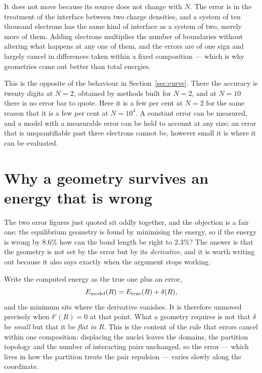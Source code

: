 \documentclass[11pt]{article}
\begin{document}
It does not move because its source does not change with $N$. The error is in the treatment of the
interface between two charge densities, and a system of ten thousand electrons has the same kind of
interface as a system of two, merely more of them. Adding electrons multiplies the number of
boundaries without altering what happens at any one of them, and the errors are of one sign and
largely cancel in differences taken within a fixed composition --- which is why geometries come out
better than total energies.

This is the opposite of the behaviour in Section~\ref{sec:curve}. There the accuracy is twenty
digits at $N=2$, obtained by methods built for $N=2$, and at $N=10$ there is no error bar to
quote. Here it is a few per cent at $N=2$ for the same reason that it is a few per cent at
$N=10^4$. A constant error can be measured, and a model with a measurable error can be held to
account at any size; an error that is unquantifiable past three electrons cannot be, however small
it is where it can be evaluated.

\section{Why a geometry survives an energy that is wrong}\label{sec:flat}

The two error figures just quoted sit oddly together, and the objection is a fair one: the
equilibrium geometry is found by minimising the energy, so if the energy is wrong by $8.6\%$ how can
the bond length be right to $2.3\%$? The answer is that the geometry is not set by the error but by
its \emph{derivative}, and it is worth writing out because it also says exactly when the argument
stops working.

Write the computed energy as the true one plus an error,
\begin{equation}\label{eq:delta}
E_{\rm model}(R) = E_{\rm true}(R) + \delta(R),
\end{equation}
and the minimum sits where the derivative vanishes. It is therefore unmoved precisely when
$\delta'(R)=0$ at that point. What a geometry requires is not that $\delta$ be \emph{small} but that
it be \emph{flat in} $R$. This is the content of the rule that errors cancel within one composition:
displacing the nuclei leaves the domains, the partition topology and the number of interacting pairs
unchanged, so the error --- which lives in how the partition treats the pair repulsion --- varies
slowly along the coordinate.
\end{document}
